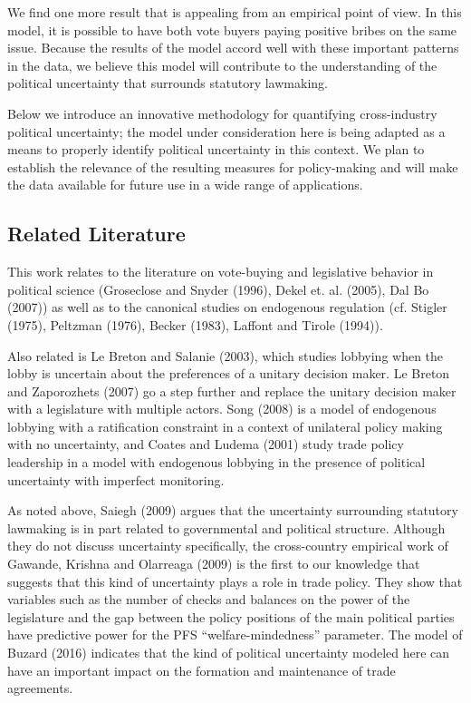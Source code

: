 \documentclass[12pt]{article}
\begin{document}
We find one more result that is appealing from an empirical point of view. In this model, it is possible to have both vote buyers paying positive bribes on the same issue. Because the results of the model accord well with these important patterns in the data, we believe this model will contribute to the understanding of the political uncertainty that surrounds statutory lawmaking.

Below we introduce an innovative methodology for quantifying cross-industry political uncertainty; the model under consideration here is being adapted as a means to properly identify political uncertainty in this context. We plan to establish the relevance of the resulting measures for policy-making and will make the data available for future use in a wide range of applications.

\subsection{Related Literature}
\label{sec:lit}

This work relates to the literature on vote-buying and legislative behavior in political science (Groseclose and Snyder (1996), Dekel et. al. (2005), Dal Bo (2007)) as well as to the canonical studies on endogenous regulation (cf. Stigler (1975), Peltzman (1976), Becker (1983), Laffont and Tirole (1994)).

Also related is Le Breton and Salanie (2003), which studies lobbying when the lobby is uncertain about the preferences of a unitary decision maker. Le Breton and Zaporozhets (2007) go a step further and replace the unitary decision maker with a legislature with multiple actors. Song (2008) is a model of endogenous lobbying with a ratification constraint in a context of unilateral policy making with no uncertainty, and Coates and Ludema (2001) study trade policy leadership in a model with endogenous lobbying in the presence of political uncertainty with imperfect monitoring.

As noted above, Saiegh (2009) argues that the uncertainty surrounding statutory lawmaking is in part related to governmental and political structure. Although they do not discuss uncertainty specifically, the cross-country empirical work of Gawande, Krishna and Olarreaga (2009) is the first to our knowledge that suggests that this kind of uncertainty plays a role in trade policy. They show that variables such as the number of checks and balances on the power of the legislature and the gap between the policy positions of the main political parties have predictive power for the PFS ``welfare-mindedness'' parameter. The model of Buzard (2016) indicates that the kind of political uncertainty modeled here can have an important impact on the formation and maintenance of trade agreements.
\end{document}
